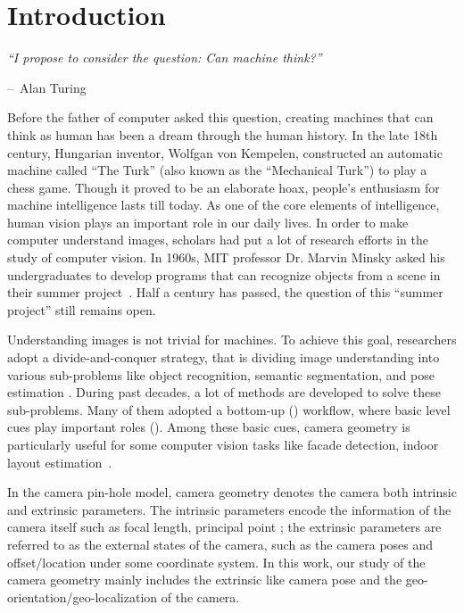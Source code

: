 \chapter{Introduction}
\label{chap:intro}

\makeatletter
\newenvironment{chapquote}[2][2em]
{\setlength{\@tempdima}{#1} \def\chapquote@author{#2} \parshape 1
  \@tempdima \dimexpr\textwidth-2\@tempdima\relax \itshape}
{\par\normalfont\hfill--\
\chapquote@author\hspace*{\@tempdima}\par\bigskip}
\makeatother

\begin{chapquote}{Alan Turing}
  ``I propose to consider the question: Can machine think?''
\end{chapquote}

Before the father of computer asked this question, creating
machines that can think as human has been a dream through the human
history. In the late 18th century, Hungarian inventor, Wolfgan von
Kempelen, constructed an automatic machine called ``The Turk'' (also
known as the ``Mechanical Turk'') to play a chess game. Though it
proved to be an elaborate hoax, people's enthusiasm for machine
intelligence lasts till today. As one of the core elements of
intelligence, human vision plays an important role in our daily lives.
In order to make computer understand images, scholars had put a lot of
research efforts in the study of computer vision. In 1960s, MIT
professor Dr. Marvin Minsky asked his undergraduates to develop
programs that can recognize objects from a scene in their summer
project~\cite{boden2006mind}. Half a century has passed, the question
of this ``summer project'' still remains open.

Understanding images is not trivial for machines.  To achieve this
goal, researchers adopt a divide-and-conquer strategy, that is
dividing image understanding into various sub-problems like object
recognition, semantic segmentation, and pose estimation \etc.  During
past decades, a lot of methods are developed to solve these
sub-problems. Many of them adopted a bottom-up ()
workflow, where basic level cues play important roles
(). Among these basic cues, camera geometry is
particularly useful for some computer vision tasks like facade
detection, indoor layout estimation~\cite{ren2016coarse}.

In the camera pin-hole model, camera geometry denotes the camera
both intrinsic and extrinsic parameters. The intrinsic parameters
encode the information of the camera itself such as focal length,
principal point \etc; the extrinsic parameters are referred to as the
external states of the camera, such as the camera poses and
offset/location under some coordinate system. In this work, our study
of the camera geometry mainly includes the extrinsic like camera pose
and the geo-orientation/geo-localization of the camera.

